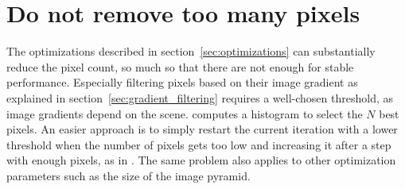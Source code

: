 \section{Do not remove too many pixels}

The optimizations described in section~\ref{sec:optimizations} can
substantially reduce the pixel count, so much so that there are not enough for
stable performance. Especially filtering pixels based on their image gradient
as explained in section~\ref{sec:gradient_filtering} requires a well-chosen
threshold, as image gradients depend on the scene. \cite{comport2007odometry}
computes a histogram to select the $N$ best pixels. An easier approach is to
simply restart the current iteration with a lower threshold when the number of
pixels gets too low and increasing it after a step with enough pixels, as in
\cite{omaridenseodometry}. The same problem also applies to other optimization
parameters such as the size of the image pyramid.
